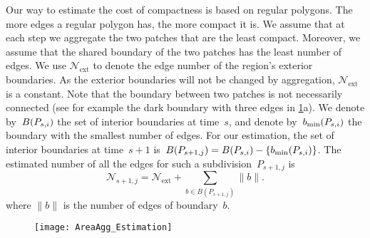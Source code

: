 Our way to estimate the cost of compactness 
is based on regular polygons.
The more edges a regular polygon has, the more compact it is.
We assume that at each step 
we aggregate the two patches that are the least compact.
Moreover, we assume that the shared boundary of the two patches  
has the least number of edges.
We use $\mathcal{N}_\mathrm{ext}$ to 
denote the edge number of the region's exterior boundaries.
As the exterior boundaries will not be changed by aggregation, 
$\mathcal{N}_\mathrm{ext}$ 
is a constant. 
%
Note that the boundary between two patches 
is not necessarily connected 
(see for example the dark boundary with three edges 
in \fig\ref{fig:AreaAgg_h_comp}a).
We denote by~$B(P_{s,i})$ 
the set of interior boundaries at time~$s$,
and denote by~$b_\mathrm{min}(P_{s,i})$ 
the boundary with the smallest number of edges.
For our estimation, the set of interior boundaries 
at time~$s+1$ 
is~$B(P_{s+1,j})= B(P_{s,i})-{\{b_\mathrm{min}(P_{s,i})\}}$. 
The estimated number of all the edges for 
such a subdivision~$P_{s+1,j}$ is
\begin{equation}
\label{eq:LeftEdgeNum}
\mathcal{N}_{s+1,j}=
\mathcal{N}_\mathrm{ext} + \sum_{b \in B(P_{s+1,j})} \|b\|.
\end{equation}
where $\|b\|$ is the number of edges of boundary~$b$.

\begin{figure*}[tb]
\centering
\texttt{[image: AreaAgg\_Estimation]}
\label{fig:AreaAgg_h_comp}
\end{figure*}

